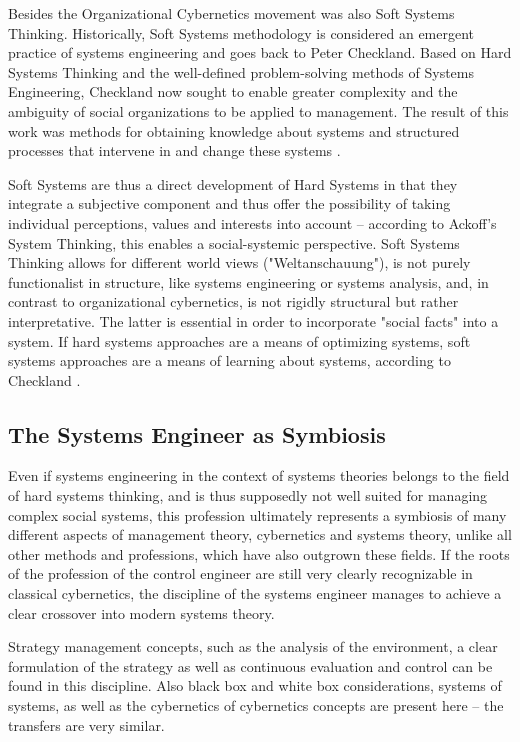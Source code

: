 \documentclass[a4paper,12pt]{article}
\begin{document}
Besides the Organizational Cybernetics movement was also Soft Systems
Thinking. Historically, Soft Systems methodology is considered an emergent
practice of systems engineering and goes back to Peter Checkland. Based on
Hard Systems Thinking and the well-defined problem-solving methods of Systems
Engineering, Checkland now sought to enable greater complexity and the
ambiguity of social organizations to be applied to management. The result of
this work was methods for obtaining knowledge about systems and structured
processes that intervene in and change these systems \cite{jackson:1991}.

Soft Systems are thus a direct development of Hard Systems in that they
integrate a subjective component and thus offer the possibility of taking
individual perceptions, values and interests into account -- according to
Ackoff's System Thinking, this enables a social-systemic perspective. Soft
Systems Thinking allows for different world views ("Weltanschauung"), is not
purely functionalist in structure, like systems engineering or systems
analysis, and, in contrast to organizational cybernetics, is not rigidly
structural but rather interpretative. The latter is essential in order to
incorporate "social facts" into a system. If hard systems approaches are a
means of optimizing systems, soft systems approaches are a means of learning
about systems, according to Checkland \cite{checkland:1983}. 

\subsection{The Systems Engineer as Symbiosis}	

Even if systems engineering in the context of systems theories belongs to the
field of hard systems thinking, and is thus supposedly not well suited for
managing complex social systems, this profession ultimately represents a
symbiosis of many different aspects of management theory, cybernetics and
systems theory, unlike all other methods and professions, which have also
outgrown these fields. If the roots of the profession of the control engineer
are still very clearly recognizable in classical cybernetics, the discipline
of the systems engineer manages to achieve a clear crossover into modern
systems theory. 

Strategy management concepts, such as the analysis of the environment, a clear
formulation of the strategy as well as continuous evaluation and control can
be found in this discipline. Also black box and white box considerations,
systems of systems, as well as the cybernetics of cybernetics concepts are
present here -- the transfers are very similar.  
\end{document}
